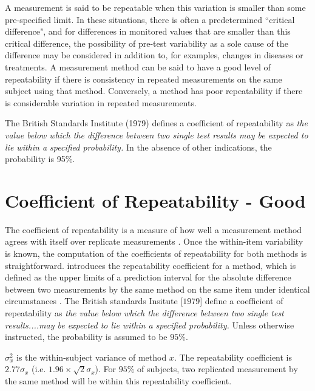 \documentclass[12pt, a4paper]{report}
\theoremstyle{plain}
\theoremstyle{definition}
\theoremstyle{remark}
\begin{document}
		
		A measurement is said to be repeatable when this variation is smaller than some pre-specified limit. In these situations, there is often a predetermined ``critical difference", and for differences in monitored values that are smaller than this critical difference, the possibility of pre-test variability as a sole cause of the difference may be considered in addition to, for examples, changes in diseases or treatments. \bigskip
		A measurement method can be said to have a good level of repeatability if there is consistency in repeated measurements on the same subject using that method. Conversely, a method has poor repeatability if there is considerable variation in repeated measurements.	
		
		The British Standards Institute (1979) defines a coefficient of repeatability  as \emph{the value below which the difference between two single test results may be expected to lie within a specified probability.} In the absence of other indications, the probability is 95\%.
		


	\section{Coefficient of Repeatability - Good}
	The coefficient of repeatability is a measure of how well a
	measurement method agrees with itself over replicate measurements
	\citep{BA99}. Once the within-item variability is known, the
	computation of the coefficients of repeatability for both methods
	is straightforward.
	\citet{BA99} introduces the repeatability coefficient for a method, which is defined as the upper limits of a prediction interval for the absolute difference between two measurements by the same
	method on the same item under identical circumstances \citep{BXC2008}.	
	The British standards Insitute [$1979$] define a coefficient of
	repeatability  as \emph{the value below which the difference between two single test results....may be expected to lie within a specified probability.} Unless otherwise instructed, the
	probability is assumed to be $95\%$. 
		
		$\sigma^2_{x}$ is the within-subject variance of method $x$. The repeatability coefficient is $2.77 \sigma_{x}$ (i.e. $1.96 \times \sqrt{2} \sigma_{x}$). For $95\%$ of subjects, two replicated measurement by the same method will be within this repeatability coefficient. \bigskip
		
\end{document}
